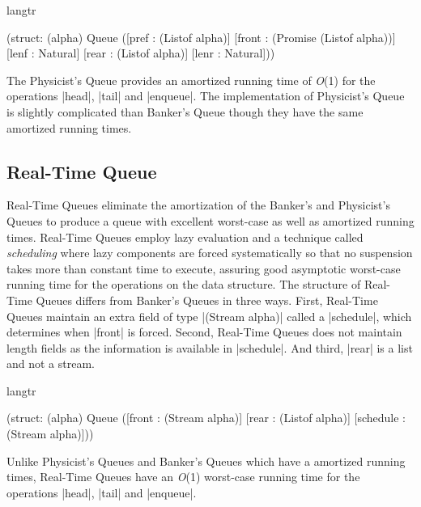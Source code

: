 \begin{datastructure}
\begin{schemedisplay}
  langtr

  (struct: (alpha) Queue
    ([pref  : (Listof alpha)]
     [front : (Promise (Listof alpha))]
     [lenf  : Natural]
     [rear  : (Listof alpha)]
     [lenr  : Natural]))

\end{schemedisplay}
\end{datastructure}

The Physicist's Queue provides an amortized running time of \emph{O}(1)
for the operations \scheme|head|, \scheme|tail| and
\scheme|enqueue|. The implementation of Physicist's Queue is slightly
complicated than Banker's Queue though they have the same amortized
running times.

\subsection*{Real-Time Queue}
Real-Time Queues eliminate the amortization of the Banker's and
Physicist's Queues to produce a queue with excellent worst-case as well
as amortized running times. Real-Time Queues employ lazy evaluation and
a technique called \emph{scheduling} \citep{oka} where lazy components
are forced systematically so that no suspension takes more than constant
time to execute, assuring good asymptotic worst-case running time for
the operations on the data structure. The structure of Real-Time Queues
differs from Banker's Queues in three ways. First, Real-Time Queues
maintain an extra field of type \scheme|(Stream alpha)| called a
\scheme|schedule|, which determines when \scheme|front| is
forced. Second, Real-Time Queues does not maintain length fields as the
information is available in \scheme|schedule|. And third, \scheme|rear|
is a list and not a stream.

\begin{datastructure}
\begin{schemedisplay}
  langtr
  
  (struct: (alpha) Queue
    ([front      : (Stream alpha)]
     [rear       : (Listof alpha)]
     [schedule : (Stream alpha)]))
\end{schemedisplay}
\end{datastructure}

Unlike Physicist's Queues and Banker's Queues which have a amortized
running times, Real-Time Queues have an \emph{O}(1) worst-case running
time for the operations \scheme|head|, \scheme|tail| and
\scheme|enqueue|.


